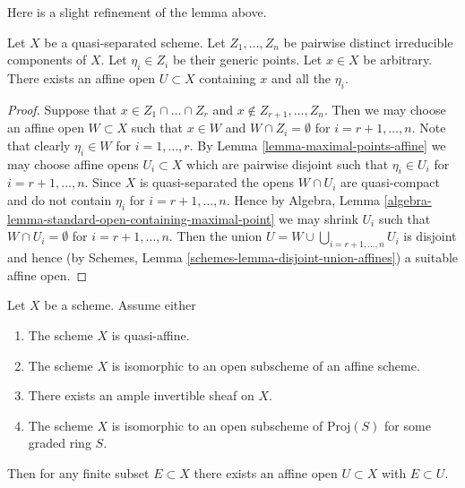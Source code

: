 \noindent
Here is a slight refinement of the lemma above.

\begin{lemma}
\label{lemma-point-and-maximal-points-affine}
Let $X$ be a quasi-separated scheme. Let $Z_1, \ldots, Z_n$ be pairwise
distinct irreducible components of $X$. Let $\eta_i \in Z_i$ be their
generic points. Let $x \in X$ be arbitrary.
There exists an affine open $U \subset X$ containing
$x$ and all the $\eta_i$.
\end{lemma}

\begin{proof}
Suppose that $x \in Z_1 \cap \ldots \cap Z_r$ and
$x \not \in Z_{r + 1}, \ldots, Z_n$. Then we may choose
an affine open $W \subset X$ such that
$x \in W$ and $W \cap Z_i = \emptyset$ for
$i = r + 1, \ldots, n$. Note that clearly $\eta_i \in W$
for $i = 1, \ldots, r$. By Lemma \ref{lemma-maximal-points-affine}
we may choose affine opens $U_i \subset X$ which are pairwise
disjoint such that $\eta_i \in U_i$ for $i = r + 1, \ldots, n$.
Since $X$ is quasi-separated the opens $W \cap U_i$
are quasi-compact and do not contain $\eta_i$ for
$i = r + 1, \ldots, n$. Hence by
Algebra, Lemma \ref{algebra-lemma-standard-open-containing-maximal-point}
we may shrink $U_i$ such that $W \cap U_i = \emptyset$
for $i = r + 1, \ldots, n$. Then the union
$U = W \cup \bigcup_{i = r + 1, \ldots, n} U_i$ is disjoint and hence
(by Schemes, Lemma \ref{schemes-lemma-disjoint-union-affines})
a suitable affine open.
\end{proof}

\begin{lemma}
\label{lemma-ample-finite-set-in-affine}
Let $X$ be a scheme. Assume either
\begin{enumerate}
\item The scheme $X$ is quasi-affine.
\item The scheme $X$ is isomorphic to an open subscheme of an affine scheme.
\item There exists an ample invertible sheaf on $X$.
\item The scheme $X$ is isomorphic to an open subscheme
of $\text{Proj}(S)$ for some graded ring $S$.
\end{enumerate}
Then for any finite subset $E \subset X$ there exists an
affine open $U \subset X$ with $E \subset U$.
\end{lemma}

